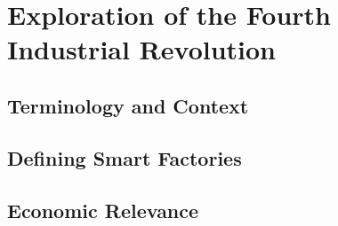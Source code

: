 \chapter{Exploration of the Fourth Industrial Revolution}

\section{Terminology and Context}
\section{Defining Smart Factories}
\section{Economic Relevance}
